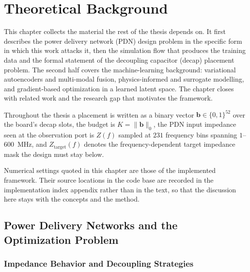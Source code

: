 
\chapter{Theoretical Background}
\label{ch:theory_background}

This chapter collects the material the rest of the thesis depends on. It first
describes the power delivery network (PDN) design problem in the specific form in
which this work attacks it, then the simulation flow that produces the training
data and the formal statement of the decoupling capacitor (decap) placement
problem. The second half covers the machine-learning background: variational
autoencoders and multi-modal fusion, physics-informed and surrogate modelling,
and gradient-based optimization in a learned latent space. The chapter closes
with related work and the research gap that motivates the framework.

Throughout the thesis a placement is written as a binary vector
$\mathbf{b} \in \{0,1\}^{52}$ over the board's decap slots, the budget is
$K = \lVert \mathbf{b} \rVert_0$, the PDN input impedance seen at the observation
port is $Z(f)$ sampled at $231$ frequency bins spanning $1$--$600$~MHz, and
$Z_{\mathrm{target}}(f)$ denotes the frequency-dependent target impedance mask
the design must stay below.

Numerical settings quoted in this chapter are those of the implemented
framework. Their source locations in the code base are recorded in the
implementation index appendix rather than in the text, so that the discussion
here stays with the concepts and the method.

\section{Power Delivery Networks and the Optimization Problem}
\label{sec:pdn_optimization}

\subsection{Impedance Behavior and Decoupling Strategies}
\label{subsec:impedance_decoupling}

